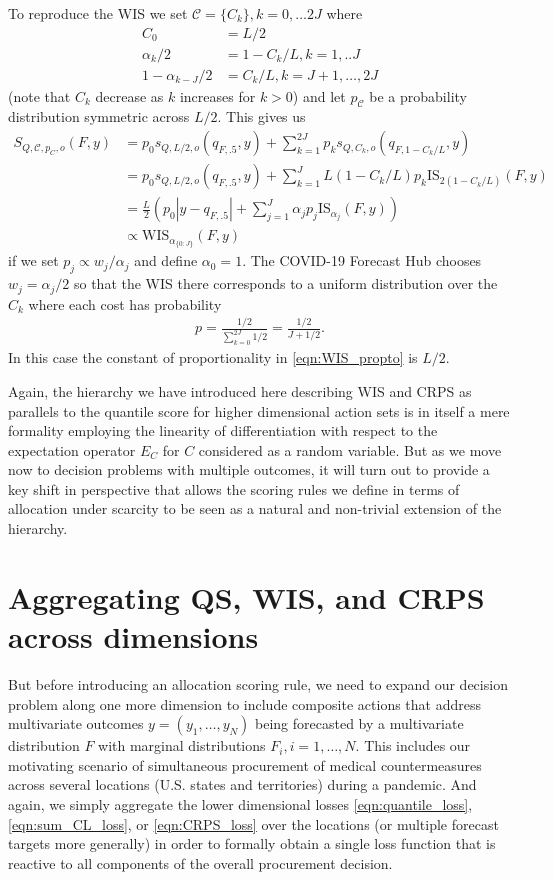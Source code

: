 \documentclass{article}
\begin{document}
To reproduce the WIS we set $\mathcal{C} = \{C_k\}, k = 0,\ldots 2J$ where 
\begin{align}
C_0 &= L/2 \\
\alpha_k/2 &= 1-C_k/L, k=1,..J \\
1-\alpha_{k-J}/2 &= C_k/L, k = J+1,\ldots,2J
\end{align}
(note that $C_k$ decrease as $k$ increases for $k>0$)
and let $p_{\mathcal{C}}$ be a probability distribution symmetric across $L/2$. This gives us
\begin{align}	
S_{Q,\mathcal{C}, p_C, o}(F,y) &= p_0 s_{Q,L/2, o}(q_{F,.5},y) + \sum_{k = 1}^{2J} p_k s_{Q,C_k, o}(q_{F, 1-C_k/L},y) \\
& =  p_0 s_{Q,L/2, o}(q_{F,.5},y) + \sum_{k = 1}^{J} L(1-C_k/L)p_k \mathrm{IS}_{2(1-C_k/L)}(F,y) \\
& = \frac{L}{2} \left(p_0|y-q_{F,.5}| + \sum_{j = 1}^{J} \alpha_j p_j \mathrm{IS}_{\alpha_j}(F,y)\right) \\
& \propto \mathrm{WIS}_{\alpha_{\{0: J\}}}(F, y) \label{eqn:WIS_propto}
\end{align}	
if we set $p_j \propto w_j/\alpha_j$ and define $\alpha_0 = 1$. The COVID-19 Forecast Hub chooses $w_j = \alpha_j/2$ 
so that the WIS there corresponds to a uniform distribution over the $C_k$ where each cost has probability
\begin{align}
p = \frac{1/2}{\sum_{k=0}^{2J} 1/2} = \frac{1/2}{J+1/2}.
\end{align}
In this case the constant of proportionality in \eqref{eqn:WIS_propto} is $L/2$.

Again, the hierarchy we have introduced here describing WIS and CRPS as parallels to the quantile score for higher dimensional action sets is in itself a mere formality employing the linearity of differentiation with respect to the expectation operator $E_{C}$ for $C$ considered as a random variable. But as we move now to decision problems with multiple outcomes, it will turn out to provide a key shift in perspective that allows the scoring rules we define in terms of allocation under scarcity to be seen as a natural and non-trivial extension of the hierarchy. 


\section{Aggregating QS, WIS, and CRPS across dimensions}

But before introducing an allocation scoring rule, we need to expand our decision problem along one more dimension to include composite actions that address multivariate outcomes $y = (y_1,\ldots,y_N)$ being forecasted by a multivariate distribution $F$
with marginal distributions $F_i, i = 1,\ldots,N$. 
This includes our motivating scenario of simultaneous procurement of medical countermeasures across several locations (U.S. states and territories) during a pandemic. And again, we simply aggregate the lower dimensional losses \eqref{eqn:quantile_loss}, \eqref{eqn:sum_CL_loss}, or \eqref{eqn:CRPS_loss} over the locations (or multiple forecast targets more generally) in order to formally obtain a single loss function that is reactive to all components of the overall procurement decision. 
\end{document}
